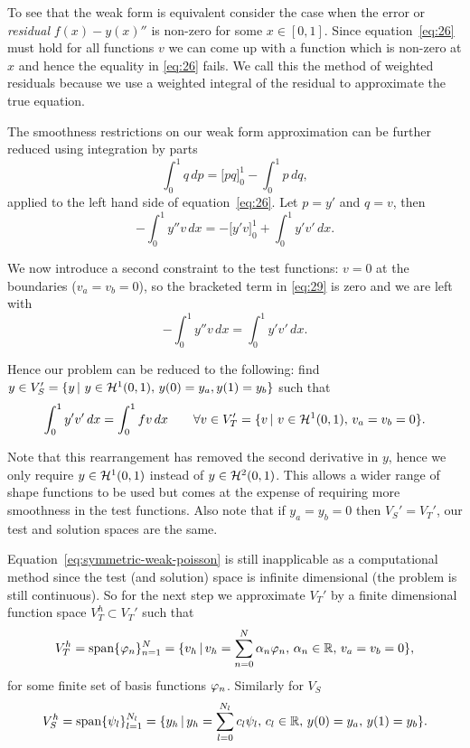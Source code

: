 To see that the weak form is equivalent consider the case when the error or \emph{residual} $f(x) -y(x)''$ is non-zero for some $x \in [0,1]$. Since equation~\eqref{eq:26} must hold for all functions $v$ we can come up with a function which is non-zero at $x$ and hence the equality in \eqref{eq:26} fails. We call this the method of weighted residuals because we use a weighted integral of the residual to approximate the true equation.\cite[210, 214]{Zeinkiewicz1967}

The smoothness restrictions on our weak form approximation can be further reduced using integration by parts
\begin{equation*}
  \int_{0}^{1}q\, dp=\Big[pq\Big]_{0}^{1}-\int_{0}^{1}p\, dq,
\end{equation*}
applied to the left hand side of equation~\eqref{eq:26}. Let $p=y'$ and $q=v$, then
\begin{equation}
  -\int_{0}^{1}y''v\, dx=-\Big[y'v\Big]_{0}^{1}+\int_{0}^{1}y'v'\, dx.
  \label{eq:29}
\end{equation}

We now introduce a second constraint to the test functions: $v=0$
at the boundaries (\ie $v_a=v_b=0$), so the bracketed term in \eqref{eq:29} is
zero and we are left with
\begin{equation*}
  -\int_{0}^{1}y''v\, dx=\int_{0}^{1}y'v'\, dx.
\end{equation*}

Hence our problem can be reduced to the following: find $y\in V_{S}'=\{y \,|\, \, y \in \mathcal{H}^1(0,1),\, y(0) = y_a, y(1) = y_b \}$
such that
\begin{equation}
  \int_{0}^{1}y'v'\, dx=\int_{0}^{1}fv\, dx\qquad\forall v\in V'_{T}=\{v \,|\, \, v \in \mathcal{H}^1(0,1),\, v_a=v_b=0\}.\label{eq:symmetric-weak-poisson}
\end{equation}

Note that this rearrangement has removed the second derivative in $y$, hence we only require $y \in \mathcal{H}^1(0,1)$ instead of $y \in \mathcal{H}^2(0,1)$. This allows a wider range of shape
functions to be used but comes at the expense of requiring more smoothness in
the test functions. Also note that if $y_a = y_b = 0$ then $V_{S}'=V_{T}'$, our
test and solution spaces are the same.

Equation~\eqref{eq:symmetric-weak-poisson} is still inapplicable as a
computational method since the test (and solution) space is infinite dimensional
(\ie the problem is still continuous). So for the next step we approximate
$V_{T}'$ by a finite dimensional function space $V_{T}^{h}\subset V_{T}'$ such
that
\begin{equation}
  V_{T}^{h}=\text{span} \{ \varphi_{n} \}_{n=1}^{N}
  =  \{v_h \,|\, v_h = \sum_{n=0}^{N}\alpha_{n} \varphi_{n},\, \alpha_{n} \in \mathbb{R},\, v_a = v_b =0 \},
  \label{eq:30}
\end{equation}
for some finite set of basis functions $\varphi_{n}$. Similarly for $V_S$
\begin{equation}
  \label{eq:34}
    V_{S}^{h}=\text{span} \{ \psi_{l} \}_{l=1}^{N_l}
    =  \{y_h \,|\, y_h = \sum_{l=0}^{N_l}c_{l} \psi_{l},\,
    c_{l} \in \mathbb{R},\, y(0) = y_a,\, y(1) = y_b \}.
\end{equation}


